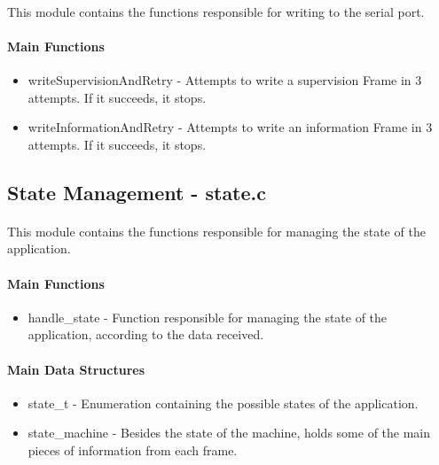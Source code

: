 \documentclass[11pt]{article}
\begin{document}
\paragraph{}This module contains the functions responsible for writing to the serial port.

\paragraph{Main Functions}

\begin{itemize}
        \item{writeSupervisionAndRetry - Attempts to write a supervision Frame in 3 attempts. If it succeeds, it stops.}
        \item{writeInformationAndRetry - Attempts to write an information Frame in 3 attempts. If it succeeds, it stops.}
\end{itemize}

\subsection{State Management - state.c}

\paragraph{}This module contains the functions responsible for managing the state of the application.

\paragraph{Main Functions}

\begin{itemize}
        \item{handle\_state - Function responsible for managing the state of the application, according to the data received.}
\end{itemize}

\paragraph{Main Data Structures}

\begin{itemize}
        \item{state\_t - Enumeration containing the possible states of the application.}
        \item{state\_machine - Besides the state of the machine, holds some of the main pieces of information from each frame.}
\end{itemize}
\end{document}
